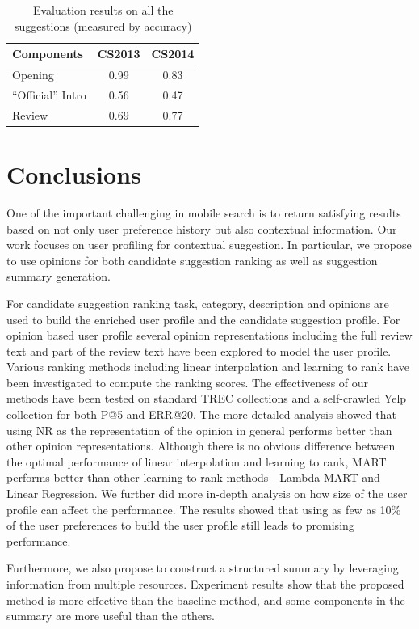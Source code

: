 \begin{table}[t]
\centering
\caption{Evaluation results on all the suggestions (measured by accuracy)} 
\label{table:summary_annotate_all}
\begin{tabular}
{ |l|c|c| }
\hline
Components &   CS2013 & CS2014 \\\hline 
Opening & 0.99 & 0.83 \\ \hline
``Official'' Intro & 0.56 & 0.47 \\ \hline
Review & 0.69 & 0.77 \\ \hline

\hline

\end{tabular}
\end{table}



\section{Conclusions} 
\label{sec:con} 


One of the important challenging in mobile search is
to return satisfying results based on not only 
user preference history but also contextual information. 
Our work focuses on user profiling for contextual suggestion. 
In particular, we propose to use opinions for both candidate 
suggestion ranking as well as suggestion summary generation. 

For candidate suggestion ranking task, category, description 
and opinions are used to build the enriched user profile and 
the candidate suggestion profile. 
For opinion based user profile several opinion representations 
including the full review text and part of the review text have 
been explored to model the user profile. 
Various ranking methods including linear interpolation and 
learning to rank have been investigated to compute the ranking scores. 
The effectiveness of our methods have been tested on standard TREC 
collections and a self-crawled Yelp collection for both P@5 and ERR@20. 
The more detailed analysis showed that using NR as the 
representation of the opinion in general performs better than other 
opinion representations. 
Although there is no obvious difference between the optimal performance 
of linear interpolation and learning to rank, MART performs better than 
other learning to rank methods - Lambda MART and Linear Regression.
We further did more in-depth analysis on how size of the user 
profile can affect the performance. The results showed that using as 
few as 10\% of the user preferences to build the user profile still 
leads to promising performance.

Furthermore, we also propose to construct a structured summary 
by leveraging information from multiple resources. Experiment results 
show that the proposed method is more effective than the baseline method, 
and some components in the summary are more useful than the others. 
